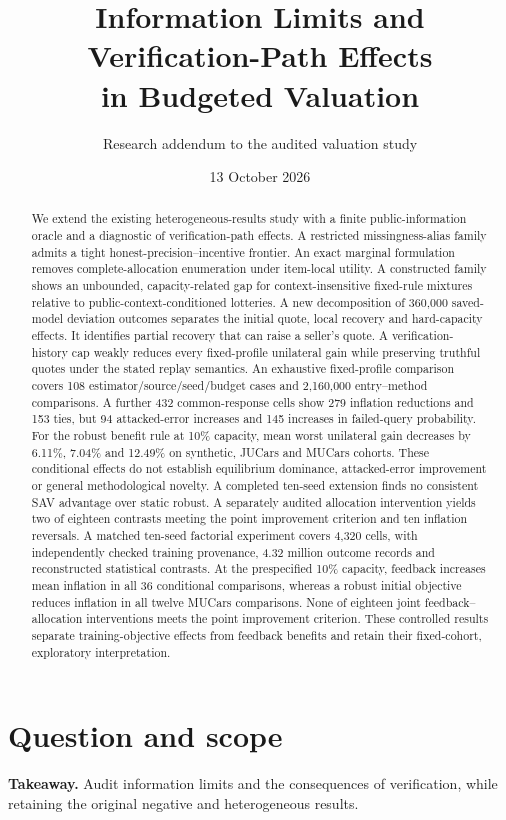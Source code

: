 \documentclass[11pt]{article}
\title{Information Limits and Verification-Path Effects\\in Budgeted Valuation}
\author{Research addendum to the audited valuation study}
\date{13 October 2026}
\begin{document}
\maketitle
\begin{abstract}
We extend the existing heterogeneous-results study with a finite public-information
oracle and a diagnostic of verification-path effects. A restricted missingness-alias
family admits a tight honest-precision--incentive frontier. An exact marginal
formulation removes complete-allocation enumeration under item-local utility.
A constructed family shows an unbounded, capacity-related gap for context-insensitive fixed-rule
mixtures relative to public-context-conditioned lotteries. A new decomposition of
360,000 saved-model deviation outcomes separates the initial quote, local recovery
and hard-capacity effects. It identifies partial recovery that can raise a seller's
quote. A verification-history cap weakly reduces every fixed-profile unilateral
gain while preserving truthful quotes under the stated replay semantics.
An exhaustive fixed-profile comparison covers 108 estimator/source/seed/budget
cases and 2,160,000 entry--method comparisons. A further 432 common-response
cells show 279 inflation reductions and 153 ties, but 94 attacked-error increases
and 145 increases in failed-query probability. For the robust benefit rule at
10\% capacity, mean worst unilateral gain decreases by 6.11\%, 7.04\% and 12.49\%
on synthetic, JUCars and MUCars cohorts. These conditional effects do not establish
equilibrium dominance, attacked-error improvement or general methodological novelty.
A completed ten-seed extension finds no consistent SAV advantage over static
robust. A separately audited allocation intervention yields two of eighteen
contrasts meeting the point improvement criterion and ten inflation reversals.
A matched ten-seed factorial experiment covers 4,320 cells, with independently
checked training provenance, 4.32 million outcome records and reconstructed
statistical contrasts. At the prespecified 10\% capacity, feedback increases
mean inflation in all 36 conditional comparisons, whereas a robust initial
objective reduces inflation in all twelve MUCars comparisons. None of eighteen
joint feedback--allocation interventions meets the point improvement criterion.
These controlled results separate training-objective effects from feedback
benefits and retain their fixed-cohort, exploratory interpretation.
\end{abstract}

\section{Question and scope}
\noindent\textbf{Takeaway.} Audit information limits and the consequences of
verification, while retaining the original negative and heterogeneous results.
\end{document}
